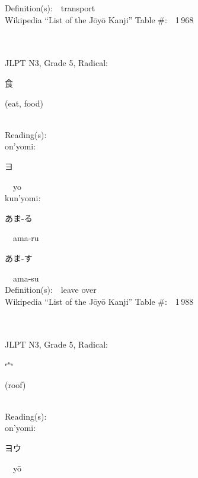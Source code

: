 \begin{multicols}{2}
Definition(s):\ \ transport \\
Wikipedia ``List of the J\=oy\=o Kanji'' Table \#:\ \ 1\,968 \\
\ \ \\
{\fontsize{34pt}{40pt}  }\ \ \\  %
{JLPT N3, Grade 5, Radical:\ \ {\begin{CJK}{UTF8}{min} 食 \end{CJK}} (eat, food) } \\
Reading(s):\ \ \\
{\hspace*{1em}}on'yomi:\ \ \\
{\hspace*{2em}}{\begin{CJK}{UTF8}{min} ヨ \end{CJK}}\ \ yo\ \ \\
{\hspace*{1em}}kun'yomi:\ \ \\
{\hspace*{2em}}{\begin{CJK}{UTF8}{min} あま-る \end{CJK}}\ \ ama-ru\ \ \\
{\hspace*{2em}}{\begin{CJK}{UTF8}{min} あま-す \end{CJK}}\ \ ama-su\ \ \\
Definition(s):\ \ leave over \\
Wikipedia ``List of the J\=oy\=o Kanji'' Table \#:\ \ 1\,988 \\
\ \ \\
{\fontsize{34pt}{40pt}  }\ \ \\  %
{JLPT N3, Grade 5, Radical:\ \ {\begin{CJK}{UTF8}{min} 宀 \end{CJK}} (roof) } \\
Reading(s):\ \ \\
{\hspace*{1em}}on'yomi:\ \ \\
{\hspace*{2em}}{\begin{CJK}{UTF8}{min} ヨウ \end{CJK}}\ \ y\=o\ \ \\

\end{multicols}
